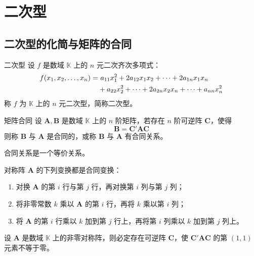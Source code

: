 \chapter{二次型}


\section{二次型的化简与矩阵的合同}

\begin{definition}{二次型}
    设 $f$ 是数域 $\mathbb{K}$ 上的 $n$ 元二次齐次多项式：
    \begin{align}
        f(x_1, x_2, \ldots, x_n) = & \ a_{11}x_{1}^{2} + 2a_{12}x_{1}x_{2} + \cdots + 2a_{1n}x_{1}x_{n}       \notag \\
                                   & + a_{22}x_{2}^{2} + \cdots + 2a_{2n}x_{2}x_{n} + \cdots + a_{nn}x_{n}^{2}
    \end{align}
    称 $f$ 为 $\mathbb{K}$ 上的 $n$ 元二次型，简称二次型。
\end{definition}

\begin{definition}{矩阵合同}
    设 $\bm{A}, \bm{B}$ 是数域 $\mathbb{K}$ 上的 $n$ 阶矩阵，若存在 $n$ 阶可逆阵 $\bm{C}$，使得
    \[
        \bm{B} = \bm{C}'\bm{AC}
    \]
    则称 $\bm{B}$ 与 $\bm{A}$ 是合同的，或称 $\bm{B}$ 与 $\bm{A}$ 有合同关系。
\end{definition}

\begin{remark}
    合同关系是一个等价关系。
\end{remark}

\begin{lemma}\label{lem:8.1.1}
    对称阵 $\bm{A}$ 的下列变换都是合同变换：
    \begin{enumerate}
        \item 对换 $\bm{A}$ 的第 $i$ 行与第 $j$ 行，再对换第 $i$ 列与第 $j$ 列；
        \item 将非零常数 $k$ 乘以 $\bm{A}$ 的第 $i$ 行，再将 $k$ 乘以第 $i$ 列；
        \item 将 $\bm{A}$ 的第 $i$ 行乘以 $k$ 加到第 $j$ 行上，再将第 $i$ 列乘以 $k$ 加到第 $j$ 列上。
    \end{enumerate}
\end{lemma}

\begin{lemma}
    设 $\bm{A}$ 是数域 $\mathbb{K}$ 上的非零对称阵，则必定存在可逆阵 $\bm{C}$，使 $\bm{C}'\bm{AC}$ 的第 $(1, 1)$ 元素不等于零。
\end{lemma}

